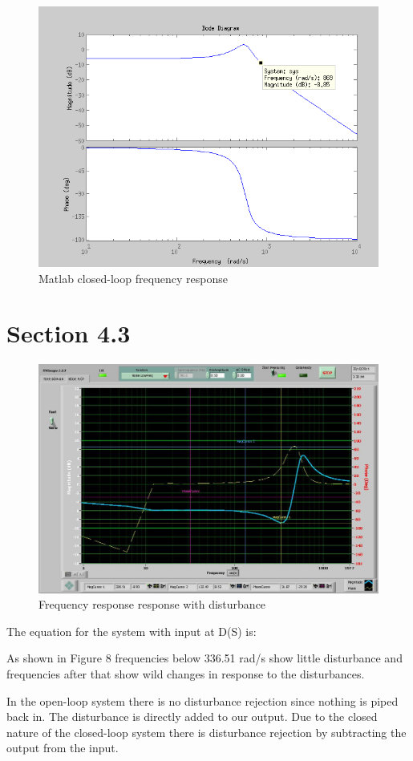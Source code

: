 \documentclass{article}
\begin{document}
\begin{figure}[!htbp]
\centering
\includegraphics[width=7in]{4_2c(closed)_matlab.png}
\caption{Matlab closed-loop frequency response}
\end{figure}

\newpage
\section*{Section 4.3} %
\label{sec:section_4_3}
\begin{figure}
\centering
\includegraphics[width=7in]{4_3.jpg}
\caption{Frequency response response with disturbance}
\end{figure}
The equation for the system with input at D(S) is:

As shown in Figure 8 frequencies below 336.51 rad/s show little disturbance and frequencies after that show wild changes in response to the disturbances.

In the open-loop system there is no disturbance rejection since nothing is piped back in. The disturbance is directly added to our output. Due to the closed nature of the closed-loop system there is disturbance rejection by subtracting the output from the input.
\end{document}
